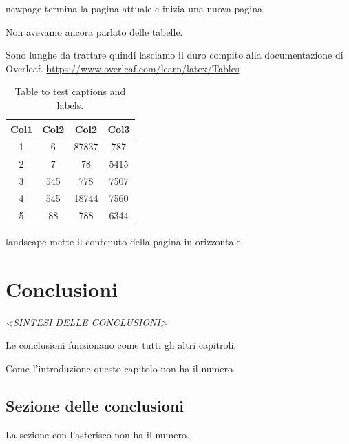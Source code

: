 \documentclass[envcountsame,envcountchap]{svmono}
\begin{document}
\newpage
newpage termina la pagina attuale e inizia una nuova pagina.

\vspace*{2cm}

Non avevamo ancora parlato delle tabelle.

Sono lunghe da trattare quindi lasciamo il duro compito alla documentazione di Overleaf.
\url{https://www.overleaf.com/learn/latex/Tables}

\begin{table}[h!]
\centering
\begin{tabular}{||c c c c||} 
    \hline
    Col1 & Col2 & Col2 & Col3 \\ [0.5ex] 
    \hline\hline
    1 & 6 & 87837 & 787 \\ 
    2 & 7 & 78 & 5415 \\
    3 & 545 & 778 & 7507 \\
    4 & 545 & 18744 & 7560 \\
    5 & 88 & 788 & 6344 \\ [1ex] 
    \hline
\end{tabular}
\caption{Table to test captions and labels.}
\label{table:1}
\end{table}


\newpage
\begin{landscape}
landscape mette il contenuto della pagina in orizzontale.
\end{landscape}
    


\chapter*{Conclusioni}

\vspace{2cm}

\begin{flushright}
 \textit{<SINTESI DELLE CONCLUSIONI>}
\end{flushright}

\vspace{0.5cm}

Le conclusioni funzionano come tutti gli altri capitroli.

Come l'introduzione questo capitolo non ha il numero.

\section*{Sezione delle conclusioni}
La sezione con l'asterisco non ha il numero.
\end{document}
